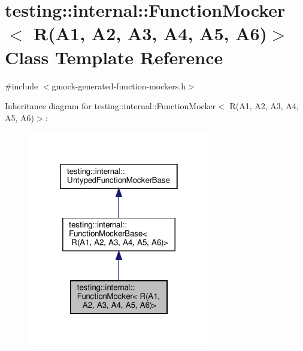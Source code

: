 \hypertarget{classtesting_1_1internal_1_1_function_mocker_3_01_r_07_a1_00_01_a2_00_01_a3_00_01_a4_00_01_a5_00_01_a6_08_4}{}\section{testing\+:\+:internal\+:\+:Function\+Mocker$<$ R(A1, A2, A3, A4, A5, A6)$>$ Class Template Reference}
\label{classtesting_1_1internal_1_1_function_mocker_3_01_r_07_a1_00_01_a2_00_01_a3_00_01_a4_00_01_a5_00_01_a6_08_4}


{\ttfamily \#include $<$gmock-\/generated-\/function-\/mockers.\+h$>$}



Inheritance diagram for testing\+:\+:internal\+:\+:Function\+Mocker$<$ R(A1, A2, A3, A4, A5, A6)$>$\+:
\nopagebreak
\begin{figure}[H]
\begin{center}
\leavevmode
\includegraphics[width=226pt]{classtesting_1_1internal_1_1_function_mocker_3_01_r_07_a1_00_01_a2_00_01_a3_00_01_a4_00_01_a5_00_01_a6_08_4__inherit__graph}
\end{center}
\end{figure}


